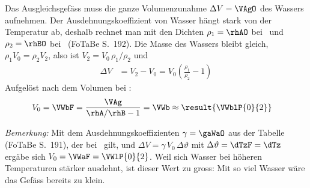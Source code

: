Das Ausgleichsgefäss muss die ganze Volumenzunahme $\Delta V = \VAgO$ des Wassers aufnehmen. Der Ausdehnungskoeffizient von Wasser hängt stark von der Temperatur ab, deshalb rechnet man mit den Dichten $\rho_1 = \rhAO$ bei \TAzO\ und $\rho_2 = \rhBO$ bei \TBzO\ (FoTaBe S.~192). Die Masse des Wassers bleibt gleich, $\rho_1 V_0 = \rho_2 V_2$, also ist $V_2 = V_0\,\rho_1/\rho_2$ und
\begin{align}
 \Delta V &= V_2 - V_0 = V_0\left(\frac{\rho_1}{\rho_2}-1\right)
\end{align}
Aufgelöst nach dem Volumen bei \TAzO:
\begin{align}
 V_0 &= \VWbF = \frac{\VAg}{\rhA/\rhB-1} = \VWb \approx \result{\VWblP{0}{2}}
\end{align}

\emph{Bemerkung:} Mit dem Ausdehnungskoeffizienten $\gamma = \gaWaO$ aus der Tabelle (FoTaBe S.~191), der bei \TtbO\ gilt, und $\Delta V = \gamma\,V_0\,\Delta\vartheta$ mit $\Delta\vartheta = \dTzF = \dTz$ ergäbe sich $V_0 = \VWaF = \VWlP{0}{2}$. Weil sich Wasser bei höheren Temperaturen stärker ausdehnt, ist dieser Wert zu gross: Mit so viel Wasser wäre das Gefäss bereits zu klein.

